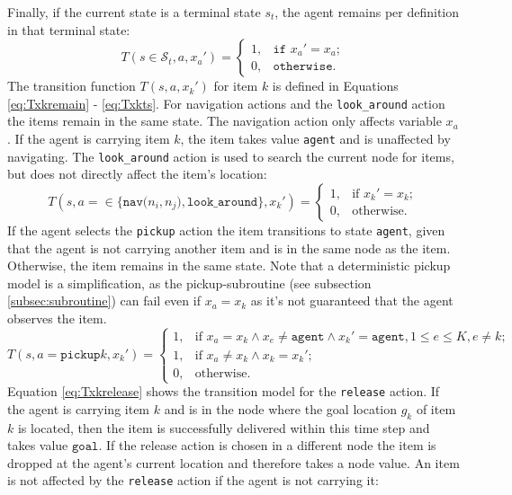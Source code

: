 Finally, if the current state is a terminal state $s_t$, the agent remains per definition in that terminal state:
\begin{equation}\label{eq:Tstxa}
    T(s\in\mathcal{S}_t, a, x_a') = \begin{cases}1, &\texttt{if }x_a'=x_a;\\
         0,& \texttt{otherwise}.\end{cases}
\end{equation}
The transition function $T(s, a, x_k')$ for item $k$ is defined in Equations \ref{eq:Txkremain} - \ref{eq:Txkts}. For navigation actions and the \texttt{look\_around} action the items remain in the same state. The navigation action only affects variable $x_a$. If the agent is carrying item $k$, the item takes value \texttt{agent} and is unaffected by navigating. The \texttt{look\_around} action is used to search the current node for items, but does not directly affect the item's location:    
\begin{equation}\label{eq:Txkremain}
    T(s, a=\in\{\texttt{nav($n_i, n_j$)},\texttt{look\_around}\}, x_k') = \begin{cases}
             1, & \text{if }x_k'=x_k;\\
             0, & \text{otherwise}.
         \end{cases}
\end{equation}
If the agent selects the \texttt{pickup} action the item transitions to state \texttt{agent}, given that the agent is not carrying another item and is in the same node as the item. Otherwise, the item remains in the same state. Note that a deterministic pickup model is a simplification, as the pickup-subroutine (see subsection \ref{subsec:subroutine}) can fail even if $x_a=x_k$ as it's not guaranteed that the agent observes the item.
\begin{equation}\label{eq:Txkpickup}
T(s,a=\texttt{pickup}k, x_k') = \begin{cases}
             1, & \text{if }x_a=x_k \land x_e\neq \texttt{agent} \land x_k'=\texttt{agent}, 1\leq e\leq K, e\neq k;  \\
             1, & \text{if }x_a \neq x_k \land x_k=x_k'; \\
             0, & \text{otherwise.}
         \end{cases}
\end{equation}
Equation \ref{eq:Txkrelease} shows the transition model for the \texttt{release} action. If the agent is carrying item $k$ and is in the node where the goal location $g_k$ of item $k$ is located, then the item is successfully delivered within this time step and takes value $\texttt{goal}$. If the release action is chosen in a different node the item is dropped at the agent's current location and therefore takes a node value. An item is not affected by the \texttt{release} action if the agent is not carrying it:

